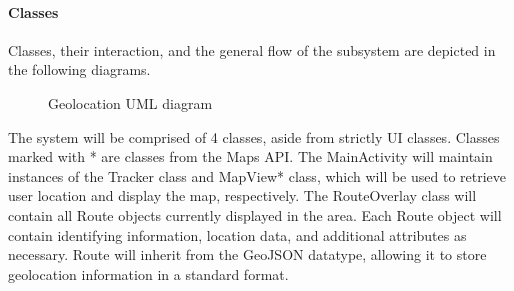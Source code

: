 \documentclass{article}
\begin{document}
\paragraph{Classes}
Classes, their interaction, and the general flow of the subsystem are depicted in the following diagrams.

\begin{figure}[H]
    \centering
    \begin{center}
    \end{center}
    \caption{Geolocation UML diagram}
    \label{fig:my_label}
\end{figure}

The system will be comprised of 4 classes, aside from strictly UI classes. Classes marked with * are classes from the Maps API. The MainActivity will maintain instances of the Tracker class and MapView* class, which will be used to retrieve user location and display the map, respectively. The RouteOverlay class will contain all Route objects currently displayed in the area. Each Route object will contain identifying information, location data, and additional attributes as necessary. Route will inherit from the GeoJSON datatype, allowing it to store geolocation information in a standard format.
\end{document}
